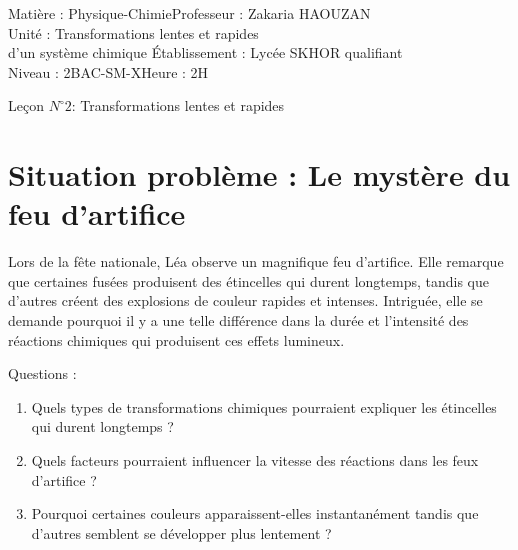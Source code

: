 \documentclass[12pt]{article}
\author{Zakaria HAOUZAN}
\date{\today}
\newcommand\headerMe[2]{\noindent{}#1\hfill#2}
\begin{document}
\headerMe{Matière : Physique-Chimie}{Professeur : Zakaria HAOUZAN}\\
\headerMe{Unité : Transformations lentes et rapides\\ d'un système chimique }{Établissement : Lycée SKHOR qualifiant}\\
\headerMe{Niveau : 2BAC-SM-X}{Heure : 2H}\\

\begin{center}

    \Large{Leçon $N^{\circ} 2 $: \color{red} Transformations lentes et rapides }
\end{center}



\section*{Situation problème : Le mystère du feu d'artifice}
Lors de la fête nationale, Léa observe un magnifique feu d'artifice. Elle remarque que certaines fusées produisent des étincelles qui durent longtemps, tandis que d'autres créent des explosions de couleur rapides et intenses. Intriguée, elle se demande pourquoi il y a une telle différence dans la durée et l'intensité des réactions chimiques qui produisent ces effets lumineux.

Questions :

\begin{enumerate}
  \item  Quels types de transformations chimiques pourraient expliquer les étincelles qui durent longtemps ?
  \item  Quels facteurs pourraient influencer la vitesse des réactions dans les feux d'artifice ?
  \item  Pourquoi certaines couleurs apparaissent-elles instantanément tandis que d'autres semblent se développer plus lentement ?
\end{enumerate}
\end{document}
